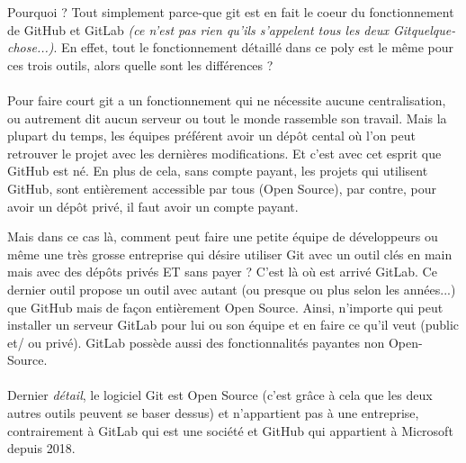 \documentclass[french, a4paper, 12pt, titlepage]{article}
\begin{document}
Pourquoi ? Tout simplement parce-que git est en fait le coeur du fonctionnement de GitHub et GitLab \emph{(ce n'est pas rien qu'ils s'appelent tous les deux Gitquelque-chose...)}. En effet, tout le fonctionnement détaillé dans ce poly est le même pour ces trois outils, alors quelle sont les différences ?

\paragraph{}Pour faire court git a un fonctionnement qui ne nécessite aucune centralisation, ou autrement dit aucun serveur ou tout le monde rassemble son travail. Mais la plupart du temps, les équipes préférent avoir un dépôt cental où l'on peut retrouver le projet avec les dernières modifications. Et c'est avec cet esprit que GitHub est né. En plus de cela, sans compte payant, les projets qui utilisent GitHub, sont entièrement accessible par tous (Open Source), par contre, pour avoir un dépôt privé, il faut avoir un compte payant.

Mais dans ce cas là, comment peut faire une petite équipe de développeurs ou
même une très grosse entreprise qui désire utiliser Git avec un outil clés en
main mais avec des dépôts privés ET sans payer ? C'est là où est arrivé GitLab.
Ce dernier outil propose un outil avec autant (ou presque ou plus selon les
années...) que GitHub mais de façon entièrement Open Source. Ainsi, n'importe
qui peut installer un serveur GitLab pour lui ou son équipe et en faire ce
qu'il veut (public et/ ou privé). GitLab possède aussi des fonctionnalités
payantes non Open-Source.

\paragraph{}Dernier \emph{détail}, le logiciel Git est Open Source (c'est grâce
à cela que les deux autres outils peuvent se baser dessus) et n'appartient pas
à une entreprise, contrairement à GitLab qui est une société et GitHub qui appartient à Microsoft
depuis 2018.
\end{document}
